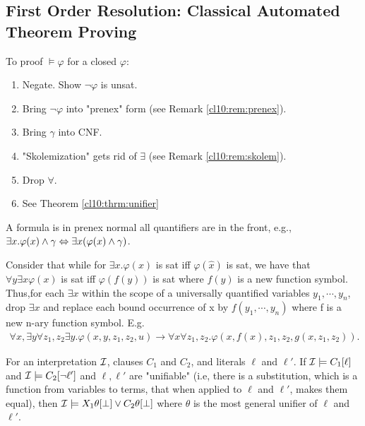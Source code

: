 \subsection{First Order Resolution: Classical Automated Theorem Proving} 



\begin{definition}
    To proof $\models \varphi $ for a closed $\varphi $:
\begin{enumerate}
    \item Negate. Show $\neg \varphi $ is unsat.
    \item Bring $\neg \varphi $ into "prenex" form (see Remark \ref{cl10:rem:prenex}).
    \item Bring $\gamma$ into CNF.
    \item "Skolemization" gets rid of $\exists$ (see Remark \ref{cl10:rem:skolem}). 
    \item Drop $\forall$.
    \item See Theorem \ref{cl10:thrm:unifier}
\end{enumerate}
\end{definition}


\begin{remark}[Prenex]
\label{cl10:rem:prenex}
A formula is in prenex normal all quantifiers are in the front, e.g., $\exists x. \varphi (x) \land \gamma \Leftrightarrow \exists x (\varphi (x) \land \gamma)$.
\end{remark}


\begin{remark}[Skolemization]
\label{cl10:rem:skolem}
    Consider that  while for $\exists x.\varphi (x)$ is sat iff $\varphi (\hat{x})$ is sat, we have that $\forall y \exists x \varphi (x)$  is sat iff $\varphi (f(y))$ is sat where $f(y)$ is a new function symbol. Thus,for each $\exists x$ within the scope of a universally quantified variables $y_1, \cdots,y_n$, drop $\exists x$ and replace each bound occurrence of x by $f(y_1,\cdots,y_n)$ where f is a new n-ary function symbol. E.g. 
        \begin{align*}
            \forall x, \exists y \forall z_1,z_2 \exists y . \varphi  (x,y,z_1,z_2, u) \rightarrow \forall x \forall z_1, z_2. \varphi  (x, f(x), z_1, z_2, g(x, z_1,z_2)).
        \end{align*}
\end{remark}

\begin{theorem}[Unifier]
    \label{cl10:thrm:unifier}
    For an interpretation $\mathcal{I}$, clauses $C_1$ and $C_2$, and literals $\ell $ and $\ell '$. If $\mathcal{I} \models C_1[\ell]$ and $\mathcal{I} \models C_2[\neg \ell']$ and $\ell , \ell'$ are "unifiable" (i.e, there is a substitution, which is a function from variables to terms, that when applied to $\ell $ and $\ell '$, makes them equal), then $\mathcal{I} \models X_1\theta [\bot] \lor C_2\theta [\bot]$ where $\theta$ is the most general unifier of $\ell $ and $\ell '$.
\end{theorem}


